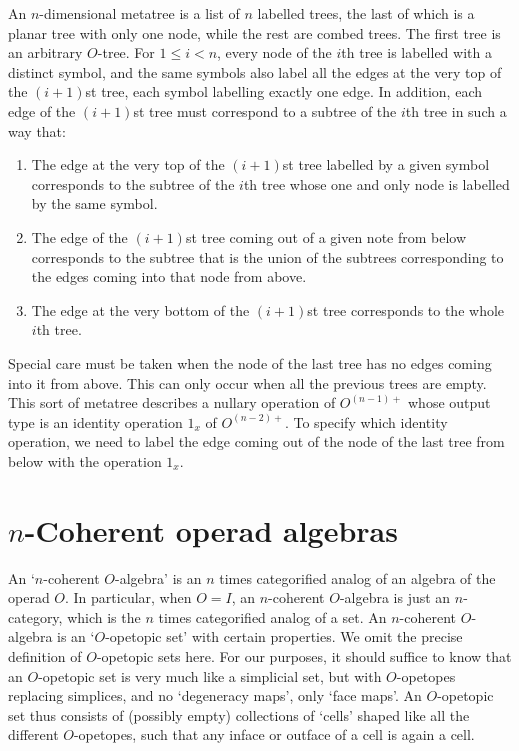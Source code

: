An $n$-dimensional metatree is a list of $n$ labelled trees, the last of
which is a planar tree with only one node, while the rest are combed
trees. The first tree is an arbitrary $O$-tree.  For $1 \le i < n$,
every node of the $i$th tree is labelled with a distinct symbol, and the
same symbols also label all the edges at the very top of the $(i + 1)$st
tree, each symbol labelling exactly one edge.  In addition, each edge of
the $(i + 1)$st tree must correspond to a subtree of the $i$th tree in
such a way that:  
\begin{enumerate} 
\item The edge at the very top of
the $(i + 1)$st tree labelled by a given symbol corresponds to the
subtree of the $i$th tree whose one and only node is labelled by the
same symbol.   
\item  The edge of the $(i + 1)$st tree coming out of a
given note from below corresponds to the subtree that is the union of
the subtrees corresponding to the edges coming into that node from
above. 
\item  The edge at the very bottom of the $(i+1)$st tree
corresponds to the whole $i$th tree. 
\end{enumerate} 
Special care must be taken when the node of the last tree has no edges
coming into it from above.  This can only occur when all the previous
trees are empty.  This sort of metatree describes a nullary operation of
$O^{(n-1)+}$ whose output type is an identity operation $1_x$ of
$O^{(n-2)+}$.  To specify which identity operation, we need to label the
edge coming out of the node of the last tree from below with the
operation $1_x$.  

\section{$n$-Coherent operad algebras}

An `$n$-coherent $O$-algebra' is an $n$ times categorified analog of an
algebra of the operad $O$.  In particular, when $O = I$, an $n$-coherent
$O$-algebra is just an $n$-category, which is the $n$ times categorified
analog of a set.   An $n$-coherent $O$-algebra is an `$O$-opetopic set'
with certain properties.  We omit the precise definition of 
$O$-opetopic sets here.  For our purposes, it should suffice to know
that an $O$-opetopic set is very much like a simplicial set, but with
$O$-opetopes replacing simplices, and no `degeneracy maps', only `face
maps'.  An $O$-opetopic set thus consists of (possibly empty) 
collections of `cells' shaped like all the different $O$-opetopes, such
that any inface or outface of a cell is again a cell.   

